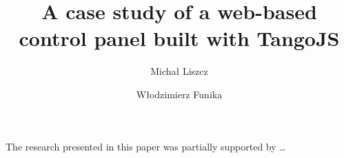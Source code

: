 \documentclass[10pt]{article}
\begin{document}
\begin{opening}

\title{A case study of a web-based control panel built with TangoJS}

\author[liszcz.michal@gmail.com]{Michał Liszcz}

\author[AGH University of Science and Technology, ACC CYFRONET AGH, Kraków, Poland, funika@agh.edu.pl]{Włodzimierz Funika}

\begin{abstract}
    
\end{abstract}


\end{opening}

\tikzset{font=\Large}



\begin{acknowledgements}
 The research presented in this paper was partially supported by \ldots
\end{acknowledgements}



\end{document}
